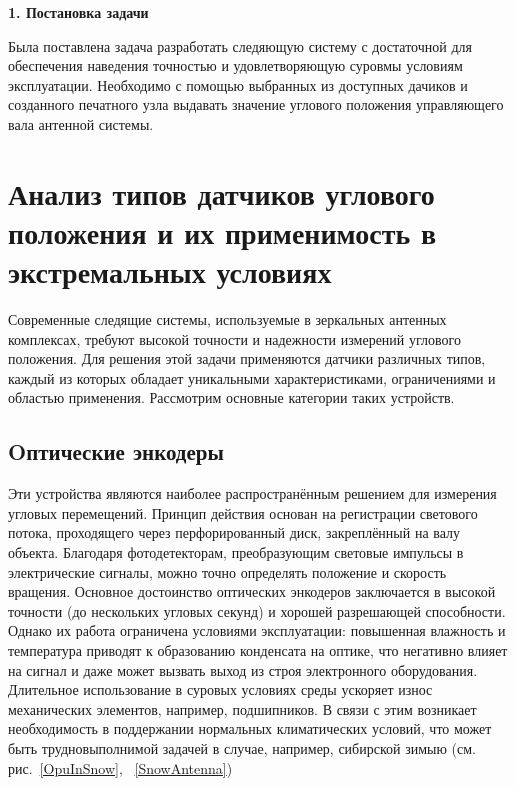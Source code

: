 \newpage
\begin{center}
  \textbf{\large 1. Постановка задачи}
\end{center}

Была поставлена задача разработать следяющую систему с достаточной для обеспечения наведения точностью и удовлетворяющую суровмы условиям эксплуатации.
Необходимо с помощью выбранных из доступных дачиков и созданного печатного узла выдавать значение углового положения управляющего вала антенной системы.

\section{Анализ типов датчиков углового положения и их применимость в экстремальных условиях}

Современные следящие системы, используемые в зеркальных антенных комплексах, требуют высокой точности и надежности измерений углового положения. 
Для решения этой задачи применяются датчики различных типов, каждый из которых обладает уникальными характеристиками, ограничениями и областью применения. 
Рассмотрим основные категории таких устройств.

\subsection{Oптические энкодеры} 
  
  Эти устройства являются наиболее распространённым решением для измерения угловых перемещений. Принцип действия основан на регистрации светового потока, проходящего через перфорированный диск, 
  закреплённый на валу объекта. Благодаря фотодетекторам, преобразующим световые импульсы в электрические сигналы, можно точно определять положение и скорость вращения.
  Основное достоинство оптических энкодеров заключается в высокой точности (до нескольких угловых секунд) и хорошей разрешающей способности. 
  Однако их работа ограничена условиями эксплуатации: повышенная влажность и температура приводят к образованию конденсата на оптике, 
  что негативно влияет на сигнал и даже может вызвать выход из строя электронного оборудования. 
  Длительное использование в суровых условиях среды ускоряет износ механических элементов, например, подшипников. В связи с этим возникает необходимость в поддержании нормальных климатических условий,
  что может быть трудновыполнимой задачей в случае, например, сибирской зимыю (см. рис.~\ref{OpuInSnow}, ~\ref{SnowAntenna})

